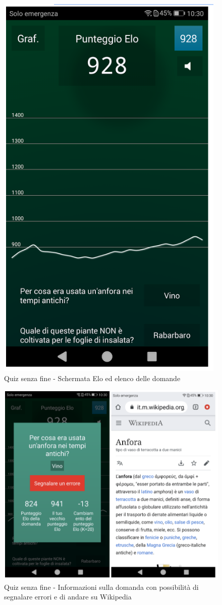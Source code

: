 \documentclass{article}
\begin{document}
\begin{figure}[htp]
\begin{center}
\includegraphics[width=0.5 \textwidth]{Figure9.png}
\caption{Quiz senza fine - Schermata Elo ed elenco delle domande}
\end{center}
\end{figure}

\begin{figure}[htp]
\begin{center}
\includegraphics[width=1 \textwidth]{Figure10.png}
\caption{Quiz senza fine - Informazioni sulla domanda con possibilità di segnalare errori e di andare su Wikipedia}
\end{center}
\end{figure}
\end{document}
